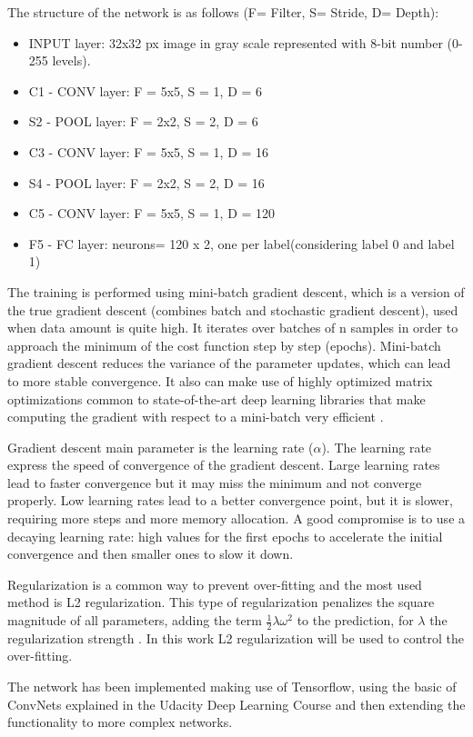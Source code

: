 \documentclass[]{article}
\begin{document}
The structure of the network is as follows (F= Filter, S= Stride, D= Depth):
\begin{itemize}
	\item INPUT layer: 32x32 px image in gray scale represented with 8-bit number (0-255 levels).
	\item C1 - CONV layer: F = 5x5, S = 1, D = 6
	\item S2 - POOL layer: F = 2x2, S = 2, D = 6
	\item C3 - CONV layer: F = 5x5, S = 1, D = 16
	\item S4 - POOL layer: F = 2x2, S = 2, D = 16
	\item C5 - CONV layer: F = 5x5, S = 1, D = 120
	\item F5 - FC layer: neurons= 120 x 2, one per label(considering label 0 and label 1)
\end{itemize}

The training is performed using mini-batch gradient descent, which is a version of the true gradient descent (combines batch and stochastic gradient descent), used when data amount is quite high. It iterates over batches of n samples in order to approach the minimum of the cost function step by step (epochs). Mini-batch gradient descent reduces the variance of the parameter updates, which can lead to more stable convergence. It also can make use of highly optimized matrix optimizations common to state-of-the-art deep learning libraries that make computing the gradient with respect to a mini-batch very efficient \cite{ruderweb}.

Gradient descent main parameter is the learning rate ($\alpha$). The learning rate express the speed of convergence of the gradient descent. Large learning rates lead to faster convergence but it may miss the minimum and not converge properly. Low learning rates lead to a better convergence point, but it is slower, requiring more steps and more memory allocation. A good compromise is to use a decaying learning rate: high values for the first epochs to accelerate the initial convergence and then smaller ones to slow it down. 

Regularization is a common way to prevent over-fitting and the most used method is L2 regularization. This type of regularization penalizes the square magnitude of all parameters, adding the term $\frac{1}{2}\lambda \omega ^2$ to the prediction, for $\lambda$ the regularization strength \cite{cs231convnets}. In this work L2 regularization will be used to control the over-fitting.

The network has been implemented making use of Tensorflow, using the basic of ConvNets explained in the Udacity Deep Learning Course \cite{deepgithub} and then extending the functionality to more complex networks.
\end{document}
